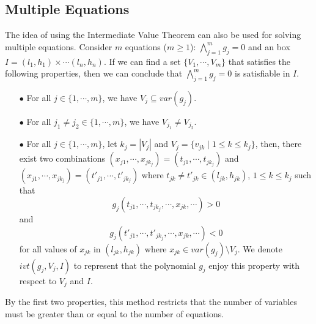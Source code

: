 \documentclass[runningheads,a4paper,oribibl]{llncs}
\begin{document}
\subsection*{Multiple Equations}
The idea of using the Intermediate Value Theorem can also be used for solving multiple equations. Consider $m$ equations ($m \ge 1$): $\bigwedge \limits_{j=1}^m g_j = 0$ and an box $ I = {(l_1, h_1) \times \cdots (l_n, h_n)}$. If we can find a set ${\{V_1, \cdots, V_m\}}$ that satisfies the following properties, then we can conclude that $\bigwedge \limits_{j=1}^m g_j = 0$ is satisfiable in $I$.
\begin{itemize}
\item[$\bullet$] For all $j \in \{1, \cdots, m\}$, we have ${V_j \subseteq var(g_j)}$.
\item[$\bullet$] For all $j_1 \neq j_2\in \{1, \cdots, m\}$, we have $V_{j_1} \neq V_{j_2}$.
\item[$\bullet$] For all $j\in \{1, \cdots, m\}$, let $k_j = |V_j|$ and ${V_j = \{v_{jk} \; | \; 1 \le k \le k_j \}}$, then, there exist two combinations ${(x_{j1}, \cdots, x_{jk_j}) = (t_{j1}, \cdots, t_{jk_j})}$ and ${(x_{j1}, \cdots, x_{jk_j}) = (t'_{j1}, \cdots, t'_{jk_j})}$ where $t_{jk} \neq t'_{jk} \in (l_{jk}, h_{jk})$, $1 \le k \le k_j$ such that \[g_j(t_{j1}, \cdots, t_{jk_j}, \cdots, x_{jk}, \cdots) > 0\] and \[g_j(t'_{j1}, \cdots, t'_{jk_j}, \cdots, x_{jk}, \cdots) < 0\] for all values of $x_{jk}$ in $(l_{jk}, h_{jk})$ where $x_{jk} \in var(g_j) \setminus V_j$. We denote $ivt(g_j, V_j, I)$ to represent that the polynomial $g_j$ enjoy this property with respect to $V_j$ and $I$.
\end{itemize}
By the first two properties, this method restricts that the number of variables must be greater than or equal to the number of equations.
\end{document}
